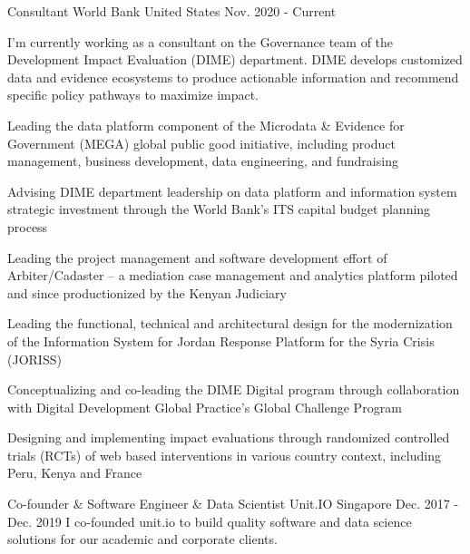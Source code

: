 

\begin{cventries}

  \cventry
    {Consultant} %
    {World Bank} %
    {United States} %
    {Nov. 2020 - Current} %
    {
      I'm currently working as a consultant on the Governance team of the Development Impact Evaluation (DIME) department. DIME develops customized data and evidence ecosystems to produce actionable information and recommend specific policy pathways to maximize impact.
      \begin{cvitems} %
        \item Leading the data platform component of the Microdata \& Evidence for Government (MEGA) global public good initiative, including product management, business development, data engineering, and fundraising
        \item Advising DIME department leadership on data platform and information system strategic investment through the World Bank's ITS capital budget planning process
        \item Leading the project management and software development effort of Arbiter/Cadaster – a mediation case management and analytics platform piloted and since productionized by the Kenyan Judiciary
        \item Leading the functional, technical and architectural design for the modernization of the Information System for Jordan Response Platform for the Syria Crisis (JORISS)
        \item Conceptualizing and co-leading the DIME Digital program through collaboration with Digital Development Global Practice's Global Challenge Program
        \item Designing and implementing impact evaluations through randomized controlled trials (RCTs) of web based interventions in various country context, including Peru, Kenya and France
      \end{cvitems}
    }

  \cventry
    {Co-founder \& Software Engineer \& Data Scientist} %
    {Unit.IO} %
    {Singapore} %
    {Dec. 2017 - Dec. 2019} %
    {
      I co-founded unit.io to build quality software and data science solutions for our academic and corporate clients.
    }


\end{cventries}
